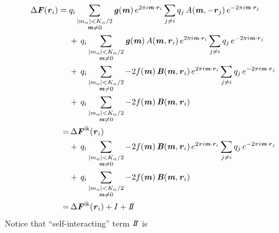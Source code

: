\documentclass[aps,pre,preprint]{revtex4}
\renewcommand{\v}[1]{\textbf{\textit{#1}}}
\begin{document}
\begin{align}\nonumber
  \Delta\v F(\v r_i)
  =\;&
  q_i
  \sum_{
    \begin{subarray}{c}
      \vert m_{\alpha}\vert < K_\alpha/2\\
      \v m\neq 0
    \end{subarray}}
  \v g(\v m)\,
  e^{2\pi i\v m\cdot \v r_i}
  \sum_{j\neq i}q_j\,
  A(\v m, -\v r_j)\,
  e^{-2\pi i\v m\cdot\v r_j} \\\nonumber
  & + \,
  q_i
  \sum_{
    \begin{subarray}{c}
      \vert m_{\alpha}\vert < K_\alpha/2\\
      \v m\neq 0
    \end{subarray}}
  \v g(\v m)\,
  A(\v m, \v r_i)\,e^{2\pi i\v m\cdot \v r_i}
  \sum_{j\neq i}q_j\,
  e^{-2\pi i\v m\cdot\v r_j} \\\nonumber
  & +\,
  q_i
  \sum_{
    \begin{subarray}{c}
      \vert m_{\alpha}\vert < K_\alpha/2\\
      \v m\neq 0
    \end{subarray}}
  -2f(\v m)\,
  \v B(\v m, \v r_i)\,e^{2\pi i\v m\cdot \v r_i}
  \sum_{j\neq i}q_j\,
  e^{-2\pi i\v m\cdot\v r_j} \\\nonumber
  & +\,
  q_i
  \sum_{
    \begin{subarray}{c}
      \vert m_{\alpha}\vert < K_\alpha/2\\
      \v m\neq 0
    \end{subarray}}
  -2f(\v m)\,\v B(\v m, \v r_i) \\\nonumber
  =&\,
  \Delta\v F^{\textrm{ik}}(\v r_i)\\\nonumber
  & +\,
  q_i
  \sum_{
    \begin{subarray}{c}
      \vert m_{\alpha}\vert < K_\alpha/2\\
      \v m\neq 0
    \end{subarray}}
  -2f(\v m)\,
  \v B(\v m, \v r_i)\,e^{2\pi i\v m\cdot \v r_i}
  \sum_{j\neq i}q_j\,
  e^{-2\pi i\v m\cdot\v r_j} \\
  & +\,
  q_i
  \sum_{
    \begin{subarray}{c}
      \vert m_{\alpha}\vert < K_\alpha/2\\
      \v m\neq 0
    \end{subarray}}
  -2f(\v m)\,\v B(\v m, \v r_i) \\
  =&\,
   \Delta\v F^{\textrm{ik}}(\v r_i) + I + I\negthickspace I
\end{align}
Notice that ``self-interacting'' term $I\negthickspace I$ is
\end{document}
